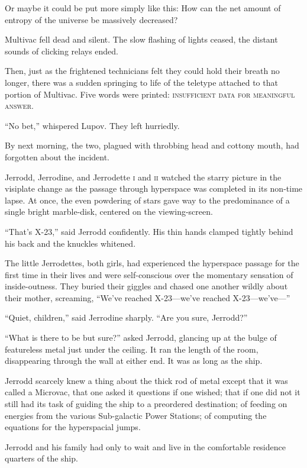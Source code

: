 Or maybe it could be put more simply like this: How can the net amount of entropy of the universe be massively decreased?

Multivac fell dead and silent. The slow flashing of lights ceased, the distant sounds of clicking relays ended.

Then, just as the frightened technicians felt they could hold their breath no longer, there was a sudden springing to life of the teletype attached to that portion of Multivac. Five words were printed: \textsc{insufficient data for meaningful answer}.

\enquote{No bet,} whispered Lupov. They left hurriedly.

By next morning, the two, plagued with throbbing head and cottony mouth, had forgotten about the incident.

\medskip

Jerrodd, Jerrodine, and Jerrodette \textsc{i} and \textsc{ii} watched the starry picture in the visiplate change as the passage through hyperspace was completed in its non-time lapse. At once, the even powdering of stars gave way to the predominance of a single bright marble-disk, centered on the viewing-screen.

\enquote{That's X-23,} said Jerrodd confidently. His thin hands clamped tightly behind his back and the knuckles whitened.

The little Jerrodettes, both girls, had experienced the hyperspace passage for the first time in their lives and were self-conscious over the momentary sensation of inside-outness. They buried their giggles and chased one another wildly about their mother, screaming, \enquote{We've reached X-23---we've reached X-23---we've---}

\enquote{Quiet, children,} said Jerrodine sharply. \enquote{Are you sure, Jerrodd?}

\enquote{What is there to be but sure?} asked Jerrodd, glancing up at the bulge of featureless metal just under the ceiling. It ran the length of the room, disappearing through the wall at either end. It was as long as the ship.

Jerrodd scarcely knew a thing about the thick rod of metal except that it was called a Microvac, that one asked it questions if one wished; that if one did not it still had its task of guiding the ship to a preordered destination; of feeding on energies from the various Sub-galactic Power Stations; of computing the equations for the hyperspacial jumps.

Jerrodd and his family had only to wait and live in the comfortable residence quarters of the ship.

